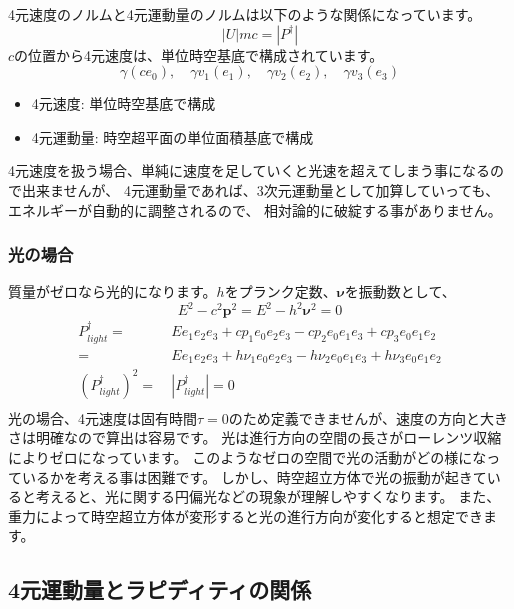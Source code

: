 \documentclass[a4paper,12pt,notitlepage]{jsreport}
\begin{document}
4元速度のノルムと4元運動量のノルムは以下のような関係になっています。
\begin{equation}
  |U| m c = |P^\dag|
\end{equation}
$ c $の位置から4元速度は、単位時空基底で構成されています。
\begin{equation}
  \gamma (c e_0), \quad \gamma v_1 (e_1), \quad \gamma v_2 (e_2), \quad \gamma v_3 (e_3)
\end{equation}

\begin{itemize}
  \item 4元速度: 単位時空基底で構成
  \item 4元運動量: 時空超平面の単位面積基底で構成
\end{itemize}

4元速度を扱う場合、単純に速度を足していくと光速を超えてしまう事になるので出来ませんが、
4元運動量であれば、3次元運動量として加算していっても、エネルギーが自動的に調整されるので、
相対論的に破綻する事がありません。

\subsubsection{光の場合}

質量がゼロなら光的になります。$ h $をプランク定数、$ \bm{\nu} $を振動数として、
\begin{equation}
  E^2 - c^2 \bm{p}^2 = E^2 - h^2 \bm{\nu}^2 = 0
\end{equation}
\begin{equation}
  \begin{split}
    P^\dag_{light} = ~ & E e_1e_2e_3 + c p_1 e_0e_2e_3 - c p_2 e_0e_1e_3 + c p_3 e_0e_1e_2 \\
    = ~ & E e_1e_2e_3 + h \nu_1 e_0e_2e_3 - h \nu_2 e_0e_1e_3 + h \nu_3 e_0e_1e_2 \\
    (P^\dag_{light})^2 = ~ & |P^\dag_{light}| = 0 \\
  \end{split}
\end{equation}
光の場合、4元速度は固有時間$ \tau = 0 $のため定義できませんが、速度の方向と大きさは明確なので算出は容易です。
光は進行方向の空間の長さがローレンツ収縮によりゼロになっています。
このようなゼロの空間で光の活動がどの様になっているかを考える事は困難です。
しかし、時空超立方体で光の振動が起きていると考えると、光に関する円偏光などの現象が理解しやすくなります。
また、重力によって時空超立方体が変形すると光の進行方向が変化すると想定できます。

\subsection{4元運動量とラピディティの関係}
\end{document}
